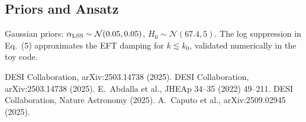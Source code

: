 \documentclass[11pt,a4paper]{article}
\begin{document}
\subsection{Priors and Ansatz}
Gaussian priors: $\alpha_{\rm LSS} \sim \mathcal{N}(0.05, 0.05)$, $H_0 \sim \mathcal{N}(67.4, 5)$. The log suppression in Eq.~(5) approximates the EFT damping for $k \lesssim k_0$, validated numerically in the toy code.
\begin{thebibliography}{99}\setlength{\itemsep}{2pt}
 DESI Collaboration, arXiv:2503.14738 (2025).
 DESI Collaboration, arXiv:2503.14738 (2025).
 E.~Abdalla et al., JHEAp 34--35 (2022) 49--211.
 DESI Collaboration, Nature Astronomy (2025).
 A.~Caputo et al., arXiv:2509.02945 (2025).
\end{thebibliography}
\end{document}
